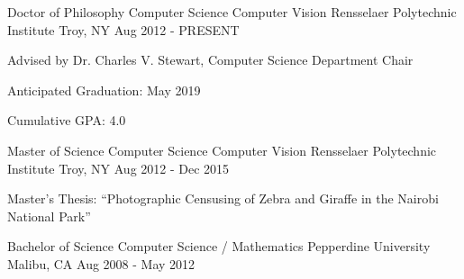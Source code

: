 

\begin{cventries}

  \cventry
    {Doctor of Philosophy \dotSep Computer Science \dotSep Computer Vision} %
    {Rensselaer Polytechnic Institute} %
    {Troy, NY} %
    {Aug 2012 - PRESENT} %
    {
      \begin{cvitems}
        \item{Advised by Dr. Charles V. Stewart, Computer Science Department Chair}
        \item{Anticipated Graduation: May 2019}
        \item{Cumulative GPA: 4.0}
      \end{cvitems}
    }

  \cventry
    {Master of Science \dotSep Computer Science \dotSep Computer Vision} %
    {Rensselaer Polytechnic Institute} %
    {Troy, NY} %
    {Aug 2012 - Dec 2015} %
    {
      \begin{cvitems} %
        \item{Master's Thesis:  ``Photographic Censusing of Zebra and Giraffe in the Nairobi National Park''}
      \end{cvitems}
    }

  \cventryshort
    {Bachelor of Science \dotSep Computer Science / Mathematics} %
    {Pepperdine University} %
    {Malibu, CA} %
    {Aug 2008 - May 2012} %

\end{cventries}
